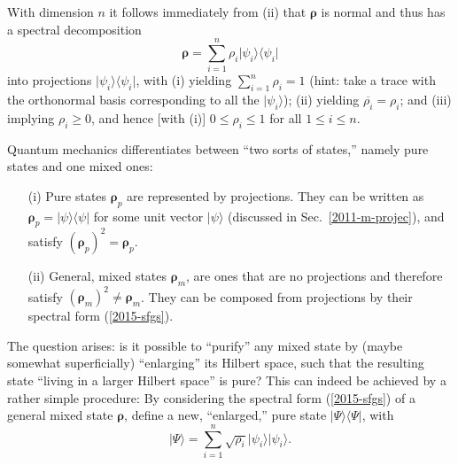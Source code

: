 With dimension $n$ it follows immediately from (ii) that $\boldsymbol{\rho}$ is normal and thus has a spectral decomposition
\begin{equation}
\boldsymbol{\rho} =\sum_{i=1}^n \rho_i \vert \psi_i\rangle \langle \psi_i \vert
\label{2015-sfgs}
\end{equation}
into projections $\vert \psi_i\rangle \langle \psi_i \vert$,
with
(i) yielding $\sum_{i=1}^n\rho_i =1$
(hint: take a trace with the orthonormal basis corresponding to all the $\vert \psi_i\rangle$);
(ii) yielding  $\overline{\rho_i}=\rho_i$;
and (iii) implying $\rho_i \ge 0$, and hence [with (i)] $0 \le \rho_i \le 1$
for all $1\le i \le n$.


Quantum mechanics differentiates between ``two sorts of states,'' namely
pure states and one mixed ones:
\begin{itemize}
\item[(i)]
Pure states ${\boldsymbol{\rho}}_p$  are
represented by projections.
They can be written as ${\boldsymbol{\rho}}_p =  \vert \psi \rangle \langle \psi  \vert$ for some unit vector $\vert \psi \rangle$
(discussed in Sec.~\ref{2011-m-projec}), and
satisfy $({\boldsymbol{\rho}}_p)^2={\boldsymbol{\rho}}_p$.
\item[(ii)]
General, mixed states ${\boldsymbol{\rho}}_m$, are ones that are no projections and therefore
satisfy $({\boldsymbol{\rho}}_m)^2 \neq {\boldsymbol{\rho}}_m$.
They can be composed from projections by their spectral form (\ref{2015-sfgs}).
\end{itemize}

The question arises: is it possible to ``purify'' any mixed state by (maybe somewhat superficially) ``enlarging'' its
Hilbert space, such that the resulting state ``living in a larger Hilbert space'' is pure?
This can indeed be achieved by a rather simple procedure:
By considering the spectral form (\ref{2015-sfgs}) of a general mixed state ${\boldsymbol{\rho}}$,
define a new, ``enlarged,'' pure state  $\vert \Psi\rangle \langle \Psi \vert$, with
\begin{equation}
\vert \Psi\rangle = \sum_{i=1}^n \sqrt{\rho_i}  \vert \psi_i\rangle  \vert \psi_i\rangle
.
\label{2015-puran}
\end{equation}

